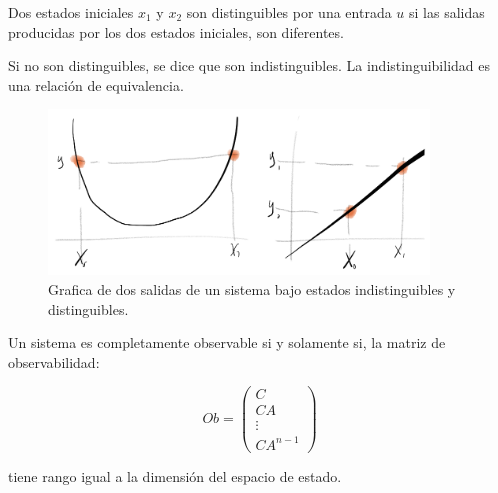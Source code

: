 		\begin{definicion}
			Dos estados iniciales $x_1$ y $x_2$ son distinguibles por una entrada $u$ si las salidas producidas por los dos estados iniciales, son diferentes.

			Si no son distinguibles, se dice que son indistinguibles. La indistinguibilidad es una relación de equivalencia.
		\end{definicion}

		\begin{figure}
            \centering
            \includegraphics[width=0.9\textwidth]{./imagenes/1.PNG}
            \caption{\label{fig:indis}Grafica de dos salidas de un sistema bajo estados indistinguibles y distinguibles.}
        \end{figure}

		\begin{teorema}
			Un sistema es completamente observable si y solamente si, la matriz de observabilidad:

			\begin{equation}
				Ob =
				\begin{pmatrix}
					C \\
					CA \\
					\vdots \\
					CA^{n-1}
				\end{pmatrix}
			\end{equation}

			tiene rango igual a la dimensión del espacio de estado.
		\end{teorema}

